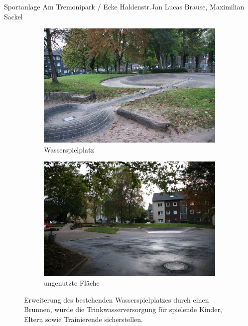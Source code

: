 \documentclass{../../templates/amendment}
\begin{document}
\begin{boxed}{Sportanlage Am Tremonipark / Ecke Haldenstr.}{Jan Lucas Brause, Maximilian Sackel}
    \begin{figure}[htpb]
        \centering
        \begin{subfigure}[]{0.49\textwidth}
            \begin{center}
                \includegraphics[width=\linewidth]{pictures/photo2.jpg}
                \caption{Wasserspielplatz}%
            \end{center}
        \end{subfigure}
        \begin{subfigure}[]{0.49\textwidth}
            \begin{center}
                \includegraphics[width=\linewidth]{pictures/photo4.jpg}
                \caption{ungenutzte Fläche}%
            \end{center}
        \end{subfigure}
        \caption{Erweiterung des bestehenden Wasserspielplatzes durch einen
            Brunnen, würde die Trinkwasserversorgung für spielende Kinder, Eltern
        sowie Trainierende sicherstellen.}
    \end{figure}
\end{boxed}
\end{document}
